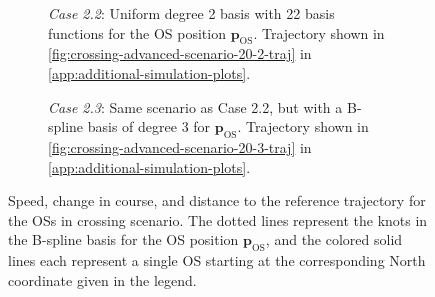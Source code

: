 \begin{figure}
    \centering
    \begin{subfigure}[b]{\textwidth}
        
        \caption{\emph{Case 2.2}: Uniform degree 2 basis with 22 basis functions for the OS position $\mathbf p_\text{OS}$. Trajectory shown in \cref{fig:crossing-advanced-scenario-20-2-traj} in \cref{app:additional-simulation-plots}.}
        \label{fig:crossing-advanced-scenario-20-2}
    \end{subfigure}
    \begin{subfigure}[b]{\textwidth}
        
        \caption{\emph{Case 2.3}: Same scenario as Case 2.2, but with a B-spline basis of degree 3 for $\mathbf p_\text{OS}$. Trajectory shown in \cref{fig:crossing-advanced-scenario-20-3-traj} in \cref{app:additional-simulation-plots}.}
        \label{fig:crossing-advanced-scenario-20-3}
    \end{subfigure}
    \caption{Speed, change in course, and distance to the reference trajectory for the OSs in crossing scenario. The dotted lines represent the knots in the B-spline basis for the OS position $\mathbf p_\text{OS}$, and the colored solid lines each represent a single OS starting at the corresponding North coordinate given in the legend.}
    \label{fig:crossing-advanced-scenario-metrics}
\end{figure}


